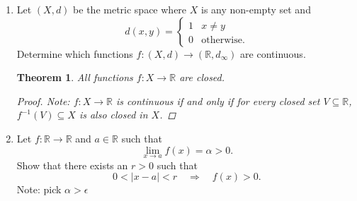 \documentclass{amsart}
\newtheorem{theorem}{Theorem}
\begin{document}
\begin{enumerate}[1.]
\newpage
\item  Let $(X,d)$ be the metric space where $X$ is any non-empty set and
\[ d(x,y) = \begin{cases} 1 & x\neq y \\ 
                          0 & \text{otherwise.}
                          \end{cases}\]
Determine which functions $f: (X,d) \rightarrow (\mathbb{R},d_{\infty})$ are continuous. 
\begin{theorem}
    All functions $f: X \to \mathbb{R}$ are closed.
    \begin{proof}
        Note: $f: X \to \mathbb{R}$ is continuous if and only if for every closed set $V \subseteq \mathbb{R}$, $f^{-1}(V) \subseteq X$ is also closed in $X$. 
    \end{proof}
\end{theorem}
\newpage
\item  Let $f:\mathbb{R} \to \mathbb{R}$ and $a \in \mathbb{R}$ such that
\[ \lim_{x \to a} f(x) = \alpha > 0.\]
Show that there exists an $r>0$ such that 
\[ 0 < |x-a|<r \quad \Rightarrow \quad f(x) > 0.\]
Note: pick $\alpha > \epsilon$

\end{enumerate}
\end{document}
